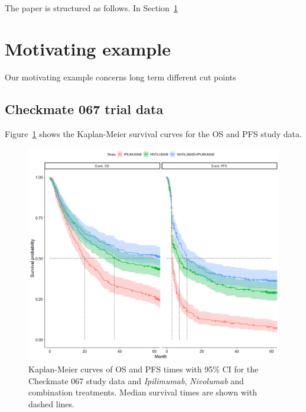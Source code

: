 \documentclass[AMA,STIX1COL]{WileyNJD-v2}
\begin{document}
The paper is structured as follows. In Section~\ref{sec:example}

\section{Motivating example}\label{sec:example}
Our motivating example concerns
long term
different cut points

\subsection{Checkmate 067 trial data}

Figure~\ref{fig:S_raw_data} shows the Kaplan-Meier survival curves for the OS and PFS study data.

\begin{figure}[!HtH]
\centering
\includegraphics[width=0.6\linewidth]{S_raw_data_with_CI.png}
\caption{\label{fig:S_raw_data} Kaplan-Meier curves of OS and PFS times with 95\% CI for the Checkmate 067 study data and {\it Ipilimumab}, {\it Nivolumab} and combination treatments.
Median survival times are shown with dashed lines.}
\end{figure}
\end{document}
